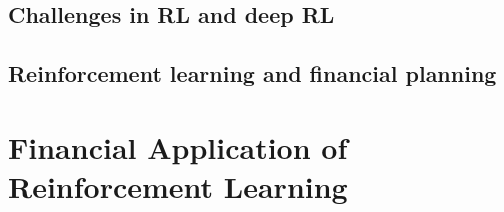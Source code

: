 \documentclass[letterpaper,10pt,english]{jupyterBook}
\begin{document}
\sphinxAtStartPar
{}

\sphinxAtStartPar
{}


\subsection{Challenges in RL and deep RL}
\label{\detokenize{Reinforcement_learning:challenges-in-rl-and-deep-rl}}

\subsection{Reinforcement learning and financial planning}
\label{\detokenize{Reinforcement_learning:reinforcement-learning-and-financial-planning}}

\section{Financial Application of Reinforcement Learning}
\label{\detokenize{Financial_application:financial-application-of-reinforcement-learning}}\label{\detokenize{Financial_application::doc}}
\end{document}
